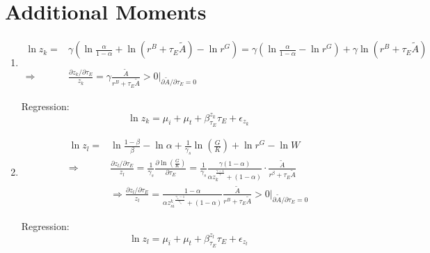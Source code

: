 \documentclass[12pt]{article} %
\begin{document}
\section*{Additional Moments}
\begin{enumerate}
    \item 
    \begin{equation*}
        \begin{split}
            \ln z_k =& {\gamma} (
            \ln \frac{\alpha}{1-\alpha} + \ln ({r^B + \tau_E\tilde{A}}) - \ln {r^G} ) =  {\gamma} (\ln \frac{\alpha}{1-\alpha} - \ln {r^G}) + {\gamma} \ln ({r^B + \tau_E\tilde{A}})\\
            \\
            \Rightarrow & \frac{\partial z_k/\partial \tau_E }{z_k} = {\gamma} \frac{\tilde{A}}{r^B + \tau_E\tilde{A}}>0\left.\Bigg|_{\partial \tilde{A} /\partial \tau_E = 0}\right.
        \end{split}
    \end{equation*}

    Regression:
    \begin{equation*}
        \ln z_k = \mu_i + \mu_t + \beta_{\tau_E}^{z_k} \tau_E + \epsilon_{z_k}
    \end{equation*}



    \item 
    \begin{equation*}
        \begin{split}
            \ln z_l =& \ln \frac{1-\beta}{\beta} - \ln {\alpha} +\frac{1}{\gamma_s} \ln (\frac{G}{K}) + \ln r^G - \ln W\\
            \Rightarrow & \frac{\partial z_l/\partial \tau_E }{z_l} = \frac{1}{\gamma_s} \frac{\partial \ln (\frac{G}{K}) }{ \partial \tau_E}  =  \frac{1}{\gamma_s}\frac{\gamma(1-\alpha)}{\alpha z_k^{\frac{\gamma-1}{\gamma}}+(1-\alpha)} \cdot \frac{\tilde{A}}{r^\beta+\tau_E \tilde{A}} \\
            & 
            \Rightarrow \frac{\partial z_l/\partial \tau_E }{z_l} = \frac{1-\alpha}{{\alpha z^k_{si}}^{\frac{\gamma_s-1}{\gamma_s}} + (1-\alpha)}\frac{\tilde{A}}{r^B + \tau_E\tilde{A}} >0\left.\Bigg|_{\partial \tilde{A} /\partial \tau_E = 0}\right.
        \end{split}
    \end{equation*}


    Regression:
    \begin{equation*}
        \ln z_l = \mu_i + \mu_t + \beta_{\tau_E}^{z_l} \tau_E + \epsilon_{z_l}
    \end{equation*}



\end{enumerate}
\end{document}

